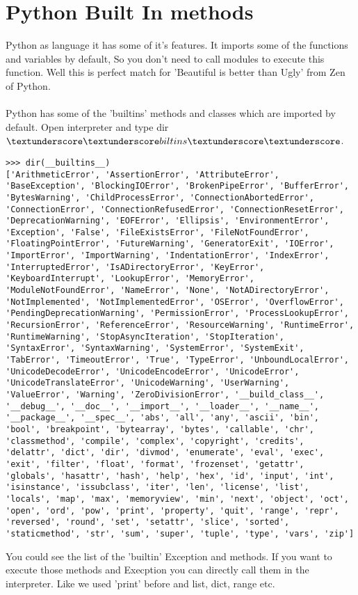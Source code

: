 \documentclass[letterpaper,12pt]{book}
\begin{document}
\section{Python Built In methods}
Python as language it has some of it's features. It imports some of the functions and variables by default, So you don't need to call modules to execute this function. Well this is perfect match for 'Beautiful is better than Ugly' from Zen of Python.
\paragraph{}
Python has some of the 'builtins' methods and classes which are imported by default. Open interpreter and type dir\(\textunderscore \textunderscore biltins \textunderscore \textunderscore\).
\begin{lstlisting}
>>> dir(__builtins__)
['ArithmeticError', 'AssertionError', 'AttributeError', 'BaseException', 'BlockingIOError', 'BrokenPipeError', 'BufferError', 'BytesWarning', 'ChildProcessError', 'ConnectionAbortedError', 'ConnectionError', 'ConnectionRefusedError', 'ConnectionResetError', 'DeprecationWarning', 'EOFError', 'Ellipsis', 'EnvironmentError', 'Exception', 'False', 'FileExistsError', 'FileNotFoundError', 'FloatingPointError', 'FutureWarning', 'GeneratorExit', 'IOError', 'ImportError', 'ImportWarning', 'IndentationError', 'IndexError', 'InterruptedError', 'IsADirectoryError', 'KeyError', 'KeyboardInterrupt', 'LookupError', 'MemoryError', 'ModuleNotFoundError', 'NameError', 'None', 'NotADirectoryError', 'NotImplemented', 'NotImplementedError', 'OSError', 'OverflowError', 'PendingDeprecationWarning', 'PermissionError', 'ProcessLookupError', 'RecursionError', 'ReferenceError', 'ResourceWarning', 'RuntimeError', 'RuntimeWarning', 'StopAsyncIteration', 'StopIteration', 'SyntaxError', 'SyntaxWarning', 'SystemError', 'SystemExit', 'TabError', 'TimeoutError', 'True', 'TypeError', 'UnboundLocalError', 'UnicodeDecodeError', 'UnicodeEncodeError', 'UnicodeError', 'UnicodeTranslateError', 'UnicodeWarning', 'UserWarning', 'ValueError', 'Warning', 'ZeroDivisionError', '__build_class__', '__debug__', '__doc__', '__import__', '__loader__', '__name__', '__package__', '__spec__', 'abs', 'all', 'any', 'ascii', 'bin', 'bool', 'breakpoint', 'bytearray', 'bytes', 'callable', 'chr', 'classmethod', 'compile', 'complex', 'copyright', 'credits', 'delattr', 'dict', 'dir', 'divmod', 'enumerate', 'eval', 'exec', 'exit', 'filter', 'float', 'format', 'frozenset', 'getattr', 'globals', 'hasattr', 'hash', 'help', 'hex', 'id', 'input', 'int', 'isinstance', 'issubclass', 'iter', 'len', 'license', 'list', 'locals', 'map', 'max', 'memoryview', 'min', 'next', 'object', 'oct', 'open', 'ord', 'pow', 'print', 'property', 'quit', 'range', 'repr', 'reversed', 'round', 'set', 'setattr', 'slice', 'sorted', 'staticmethod', 'str', 'sum', 'super', 'tuple', 'type', 'vars', 'zip']
\end{lstlisting}
You could see the list of the 'builtin' Exception and methods. If you want to execute those methods and Execption you can directly call them in the interpreter.
Like we used 'print' before and list, dict, range etc.
\end{document}
